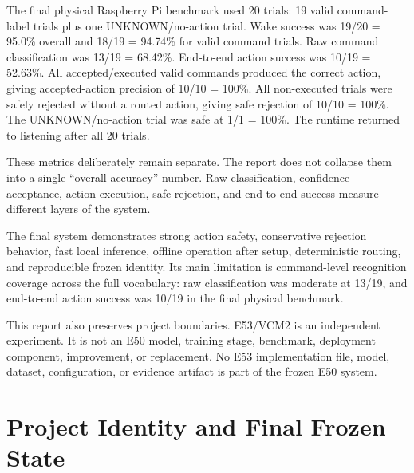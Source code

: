 \documentclass[11pt]{article}
\begin{document}
The final physical Raspberry Pi benchmark used 20 trials: 19 valid command-label trials plus one UNKNOWN/no-action trial. Wake success was 19/20 = 95.0\% overall and 18/19 = 94.74\% for valid command trials. Raw command classification was 13/19 = 68.42\%. End-to-end action success was 10/19 = 52.63\%. All accepted/executed valid commands produced the correct action, giving accepted-action precision of 10/10 = 100\%. All non-executed trials were safely rejected without a routed action, giving safe rejection of 10/10 = 100\%. The UNKNOWN/no-action trial was safe at 1/1 = 100\%. The runtime returned to listening after all 20 trials.

These metrics deliberately remain separate. The report does not collapse them into a single ``overall accuracy'' number. Raw classification, confidence acceptance, action execution, safe rejection, and end-to-end success measure different layers of the system.

The final system demonstrates strong action safety, conservative rejection behavior, fast local inference, offline operation after setup, deterministic routing, and reproducible frozen identity. Its main limitation is command-level recognition coverage across the full vocabulary: raw classification was moderate at 13/19, and end-to-end action success was 10/19 in the final physical benchmark.

This report also preserves project boundaries. E53/VCM2 is an independent experiment. It is not an E50 model, training stage, benchmark, deployment component, improvement, or replacement. No E53 implementation file, model, dataset, configuration, or evidence artifact is part of the frozen E50 system.

\section{Project Identity and Final Frozen State}
\end{document}

